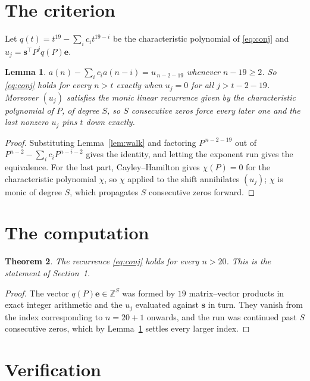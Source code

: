 \documentclass[11pt,a4paper]{article}
\theoremstyle{plain}
\newtheorem{theorem}{Theorem}
\newtheorem{lemma}[theorem]{Lemma}
\theoremstyle{definition}
\begin{document}
\section{The criterion}

Let $q(t)=t^{19}-\sum_i c_i t^{19-i}$ be the characteristic polynomial of
\eqref{eq:conj} and $u_j=\mathbf{s}^{\!\top}P^{j}q(P)\mathbf{e}$.

\begin{lemma}\label{lem:crit}
$a(n)-\sum_i c_i a(n-i)=u_{\,n-2-19}$ whenever $n-19\ge2$. So \eqref{eq:conj}
holds for every $n>t$ exactly when $u_j=0$ for all $j>t-2-19$. Moreover $(u_j)$
satisfies the monic linear recurrence given by the characteristic polynomial of $P$, of
degree $S$, so $S$ consecutive zeros force every later one and the last nonzero $u_j$ pins
$t$ down exactly.
\end{lemma}

\begin{proof}
Substituting Lemma~\ref{lem:walk} and factoring $P^{\,n-2-19}$ out of
$P^{n-2}-\sum_i c_i P^{n-i-2}$ gives the identity, and letting the exponent run gives the
equivalence. For the last part, Cayley--Hamilton gives $\chi(P)=0$ for the characteristic
polynomial $\chi$, so $\chi$ applied to the shift annihilates $(u_j)$; $\chi$ is monic of
degree $S$, which propagates $S$ consecutive zeros forward.
\end{proof}

\section{The computation}

\begin{theorem}
The recurrence \eqref{eq:conj} holds for every $n>20$. This is the statement of
Section~1.
\end{theorem}

\begin{proof}
The vector $q(P)\mathbf{e}\in\mathbb{Z}^{S}$ was formed by $19$ matrix--vector
products in exact integer arithmetic and the $u_j$ evaluated against $\mathbf{s}$ in turn.
They vanish from the index corresponding to $n=20+1$ onwards, and the run was continued
past $S$ consecutive zeros, which by Lemma~\ref{lem:crit} settles every larger index.
\end{proof}

\section{Verification}
\end{document}
